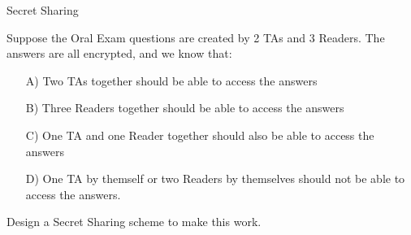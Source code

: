 \begin{homeworkProblem}{Secret Sharing}
    
    Suppose the Oral Exam questions are created by 2 TAs and 3 Readers. The 
    answers are all encrypted, and we know that:

    \begin{itemize}
        \item[A)] Two TAs together should be able to access the answers
        \item[B)] Three Readers together should be able to access the answers
        \item[C)] One TA and one Reader together should also be able to access the answers
        \item[D)] One TA by themself or two Readers by themselves should not be 
        able to access the answers.
    \end{itemize}

    Design a Secret Sharing scheme to make this work.

\end{homeworkProblem}